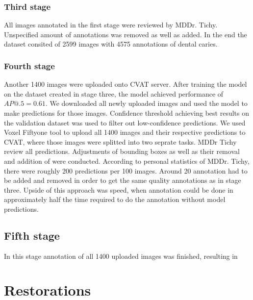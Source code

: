 \subsubsection{Third stage}
All images annotated in the first stage were reviewed by MDDr. Tichy. Unspecified amount of annotations was removed as well as added. In the end the dataset consited of 2599 images with 4575 annotations of dental caries.

\subsubsection{Fourth stage}
Another 1400 images were uploaded onto CVAT server. After training the model on the dataset created in stage three, the model achieved performance of $AP@.5=0.61$. We downloaded all newly uploaded images and used the model to make predictions for those images. Confidence threshold achieving best results on the validation dataset was used to filter out low-confidence predictions. We used Voxel Fiftyone tool to upload all 1400 images and their respective predictions to CVAT, where those images were splitted into two seprate tasks.
MDDr Tichy review all predictions. Adjustments of bounding boxes as well as their removal and addition of were conducted. According to personal statistics of MDDr. Tichy, there were roughly 200 predictions per 100 images. Around 20 annotation had to be added and removed in order to get the same quality annotations as in stage three. Upside of this approach was speed, when annotation could be done in approximately half the time required to do the annotation without model predictions.

\subsection{Fifth stage}
In this stage annotation of all 1400 uploaded images was finished, resulting in

\section{Restorations}